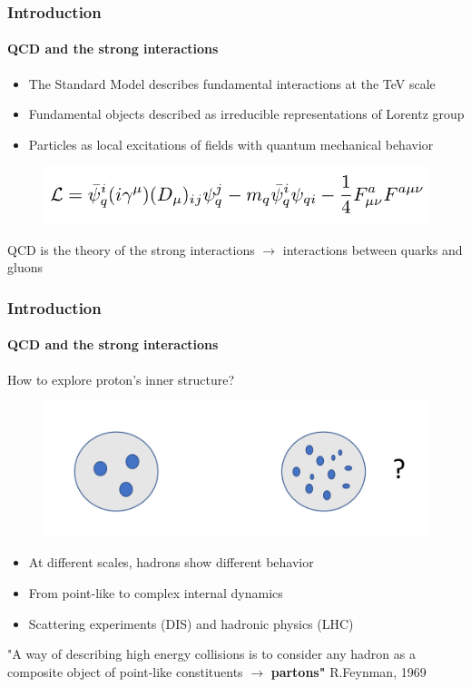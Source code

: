 \documentclass[aspectratio=43]{beamer}
\begin{document}
\begin{frame}

	\frametitle{Introduction}
	\framesubtitle{QCD and the strong interactions}
	
	\footnotesize
	
	\begin{itemize}
		\item The Standard Model describes fundamental interactions at the TeV scale
		\item Fundamental objects described as irreducible representations of Lorentz group
		\item Particles as local excitations of fields with quantum mechanical behavior
	\end{itemize}

	\begin{figure}
		\includegraphics[width = 0.5\linewidth]{plots/part1/intro/qcd_lagrangian.png}
	\end{figure}

		QCD is the theory of the strong interactions $\longrightarrow$ interactions between {\color{red} quarks and gluons}
		
\end{frame}

\begin{frame}

	\frametitle{Introduction}
	\framesubtitle{QCD and the strong interactions}
	
	\footnotesize
	
	How to explore proton's inner structure?

	\begin{figure}
		\includegraphics[width = 0.5\linewidth]{plots/part1/intro/protons.png}
	\end{figure}
	
	
	\begin{itemize}
		\item At different scales, hadrons show different behavior
		\item From point-like to complex internal dynamics
		\item Scattering experiments (DIS) and hadronic physics (LHC)
	\end{itemize}
	
	{\color{blue} \footnotesize "A way of describing high energy collisions is to consider any hadron as a composite object of point-like constituents $\longrightarrow$ \textbf{partons"} } R.Feynman, 1969 

\end{frame}
\end{document}
